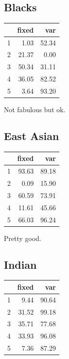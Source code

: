 \documentclass{amsart}
\begin{document}
\subsection{Blacks}
\begin{table}[ht]
\centering
\begin{tabular}{rrr}
  \hline
 & fixed & var \\ 
  \hline
1 & 1.03 & 52.34 \\ 
  2 & 21.37 & 0.00 \\ 
  3 & 50.34 & 31.11 \\ 
  4 & 36.05 & 82.52 \\ 
  5 & 3.64 & 93.20 \\ 
   \hline
\end{tabular}
\end{table}

Not fabulous but ok.

\subsection{East Asian}

\begin{table}[ht]
\centering
\begin{tabular}{rrr}
  \hline
 & fixed & var \\ 
  \hline
1 & 93.63 & 89.18 \\ 
  2 & 0.09 & 15.90 \\ 
  3 & 60.59 & 73.91 \\ 
  4 & 11.61 & 45.66 \\ 
  5 & 66.03 & 96.24 \\ 
   \hline
\end{tabular}
\end{table}

Pretty good.


\subsection{Indian}
\begin{table}[ht]
\centering
\begin{tabular}{rrr}
  \hline
 & fixed & var \\ 
  \hline
1 & 9.44 & 90.64 \\ 
  2 & 31.52 & 99.18 \\ 
  3 & 35.71 & 77.68 \\ 
  4 & 33.93 & 96.08 \\ 
  5 & 7.36 & 87.29 \\ 
   \hline
\end{tabular}
\end{table}
\end{document}
